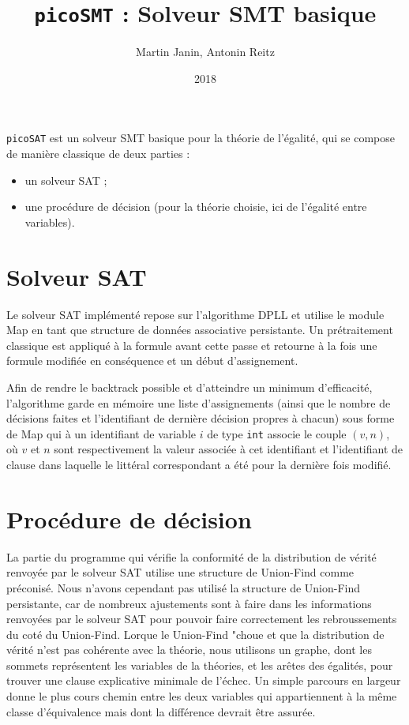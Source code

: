 \documentclass[a4paper, 11pt, twoside]{article}
\title{\texttt{picoSMT} : Solveur SMT basique}
\author{Martin Janin, Antonin Reitz}
\date{2018}
\begin{document}
\maketitle

\texttt{picoSAT} est un solveur SMT basique pour la théorie de l'égalité, qui se compose de manière classique de deux parties :
\begin{itemize}
\item un solveur SAT ;
\item une procédure de décision (pour la théorie choisie, ici de l'égalité entre variables).
\end{itemize}

\section{Solveur SAT}

Le solveur SAT implémenté repose sur l'algorithme DPLL et utilise le module Map en tant que structure de données associative persistante. Un prétraitement classique est appliqué à la formule avant cette passe et retourne à la fois une formule modifiée en conséquence et un début d'assignement.

Afin de rendre le backtrack possible et d'atteindre un minimum d'efficacité, l'algorithme garde en mémoire une liste d'assignements (ainsi que le nombre de décisions faites et l'identifiant de dernière décision propres à chacun) sous forme de Map qui à un identifiant de variable $i$ de type \texttt{int} associe le couple $(v, n)$, où $v$ et $n$ sont respectivement la valeur associée à cet identifiant et l'identifiant de clause dans laquelle le littéral correspondant a été pour la dernière fois modifié.

\section{Procédure de décision}

La partie du programme qui vérifie la conformité de la distribution de vérité
renvoyée par le solveur SAT utilise une structure de Union-Find comme préconisé.
Nous n'avons cependant pas utilisé la structure de Union-Find persistante, car
de nombreux ajustements sont à faire dans les informations renvoyées par le
solveur SAT pour pouvoir faire correctement les rebroussements du coté du
Union-Find.
Lorque le Union-Find "choue et que la distribution de vérité n'est pas cohérente
avec la théorie, nous utilisons un graphe, dont les sommets représentent les 
variables de la théories, et les arêtes des égalités, pour trouver une clause
explicative minimale de l'échec. Un simple parcours en largeur donne le plus
cours chemin entre les deux variables qui appartiennent à la même classe
d'équivalence mais dont la différence devrait être assurée.
\end{document}
